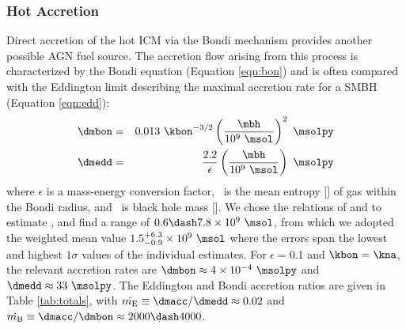 \documentclass[11pt, preprint]{aastex}
\begin{document}
\subsubsection{Hot Accretion}

Direct accretion of the hot ICM via the Bondi mechanism provides
another possible AGN fuel source. The accretion flow arising from this
process is characterized by the Bondi equation (Equation
\ref{eqn:bon}) and is often compared with the Eddington limit
describing the maximal accretion rate for a SMBH (Equation
\ref{eqn:edd}):
\begin{eqnarray}
  \dmbon &=& 0.013 ~\kbon^{-3/2} \left(\frac{\mbh}{10^9
    ~\msol}\right)^{2} ~\msolpy \label{eqn:bon}\\
  \dmedd &=& \frac{2.2}{\epsilon} \left(\frac{\mbh}{10^9~\msol}\right)
  ~\msolpy  \label{eqn:edd}
\end{eqnarray}
where $\epsilon$ is a mass-energy conversion factor, \kbon\ is the
mean entropy [\ent] of gas within the Bondi radius, and \mbh\ is black
hole mass [\msol]. We chose the relations of
\citet{2002ApJ...574..740T} and \citet{2007MNRAS.379..711G} to
estimate \mbh, and find a range of $0.6 \dash 7.8 \times 10^9 ~\msol$,
from which we adopted the weighted mean value $1.5^{+6.3}_{-0.9}
\times 10^9 ~\msol$ where the errors span the lowest and highest
$1\sigma$ values of the individual estimates. For $\epsilon = 0.1$ and
$\kbon = \kna$, the relevant accretion rates are $\dmbon \approx 4
\times 10^{-4} ~\msolpy$ and $\dmedd \approx 33 ~\msolpy$. The
Eddington and Bondi accretion ratios are given in Table
\ref{tab:totals}, with $\dme \equiv \dmacc/\dmedd \approx 0.02$ and
$\dmb \equiv \dmacc/\dmbon \approx 2000 \dash 4000$.
\end{document}

